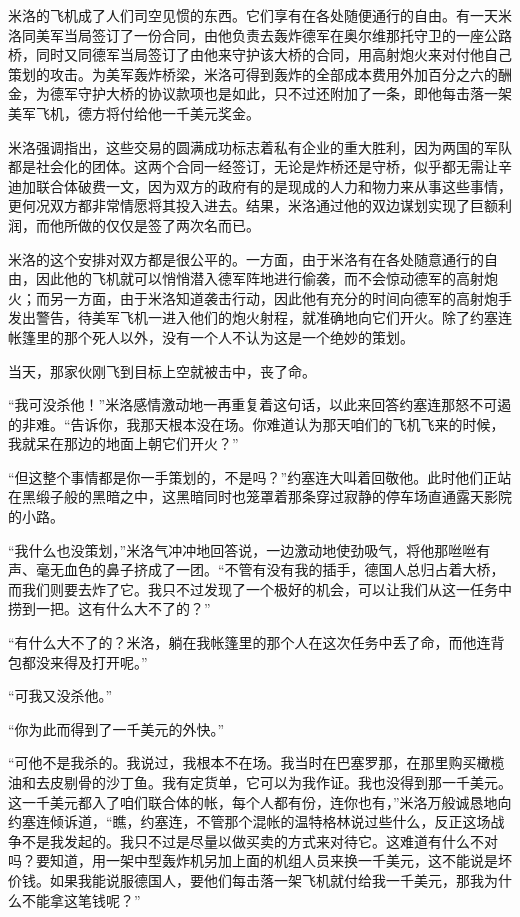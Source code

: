     米洛的飞机成了人们司空见惯的东西。它们享有在各处随便通行的自由。有一天米洛同美军当局签订了一份合同，由他负责去轰炸德军在奥尔维那托守卫的一座公路桥，同时又同德军当局签订了由他来守护该大桥的合同，用高射炮火来对付他自己策划的攻击。为美军轰炸桥梁，米洛可得到轰炸的全部成本费用外加百分之六的酬金，为德军守护大桥的协议款项也是如此，只不过还附加了一条，即他每击落一架美军飞机，德方将付给他一千美元奖金。
 


    米洛强调指出，这些交易的圆满成功标志着私有企业的重大胜利，因为两国的军队都是社会化的团体。这两个合同一经签订，无论是炸桥还是守桥，似乎都无需让辛迪加联合体破费一文，因为双方的政府有的是现成的人力和物力来从事这些事情，更何况双方都非常情愿将其投入进去。结果，米洛通过他的双边谋划实现了巨额利润，而他所做的仅仅是签了两次名而已。

    米洛的这个安排对双方都是很公平的。一方面，由于米洛有在各处随意通行的自由，因此他的飞机就可以悄悄潜入德军阵地进行偷袭，而不会惊动德军的高射炮火；而另一方面，由于米洛知道袭击行动，因此他有充分的时间向德军的高射炮手发出警告，待美军飞机一进入他们的炮火射程，就准确地向它们开火。除了约塞连帐篷里的那个死人以外，没有一个人不认为这是一个绝妙的策划。

    当天，那家伙刚飞到目标上空就被击中，丧了命。

    “我可没杀他！”米洛感情激动地一再重复着这句话，以此来回答约塞连那怒不可遏的非难。“告诉你，我那天根本没在场。你难道认为那天咱们的飞机飞来的时候，我就呆在那边的地面上朝它们开火？”

    “但这整个事情都是你一手策划的，不是吗？”约塞连大叫着回敬他。此时他们正站在黑缎子般的黑暗之中，这黑暗同时也笼罩着那条穿过寂静的停车场直通露天影院的小路。

    “我什么也没策划，”米洛气冲冲地回答说，一边激动地使劲吸气，将他那咝咝有声、毫无血色的鼻子挤成了一团。“不管有没有我的插手，德国人总归占着大桥，而我们则要去炸了它。我只不过发现了一个极好的机会，可以让我们从这一任务中捞到一把。这有什么大不了的？”

    “有什么大不了的？米洛，躺在我帐篷里的那个人在这次任务中丢了命，而他连背包都没来得及打开呢。”

    “可我又没杀他。”

    “你为此而得到了一千美元的外快。”

    “可他不是我杀的。我说过，我根本不在场。我当时在巴塞罗那，在那里购买橄榄油和去皮剔骨的沙丁鱼。我有定货单，它可以为我作证。我也没得到那一千美元。这一千美元都入了咱们联合体的帐，每个人都有份，连你也有，”米洛万般诚恳地向约塞连倾诉道，“瞧，约塞连，不管那个混帐的温特格林说过些什么，反正这场战争不是我发起的。我只不过是尽量以做买卖的方式来对待它。这难道有什么不对吗？要知道，用一架中型轰炸机另加上面的机组人员来换一千美元，这不能说是坏价钱。如果我能说服德国人，要他们每击落一架飞机就付给我一千美元，那我为什么不能拿这笔钱呢？”

